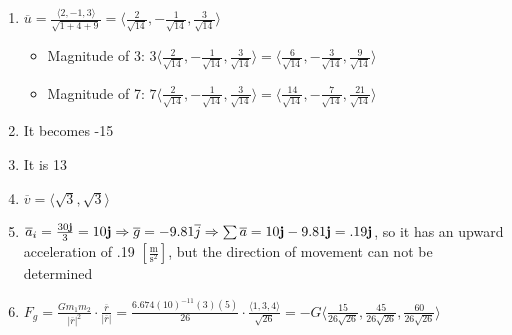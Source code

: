 \begin{enumerate}
\begin{itemize}
    \end{itemize}

    \setcounter{enumi}{35}

  \item $\overline{u} = \frac{\langle 2, -1, 3 \rangle}{\sqrt{1 + 4 + 9}} = \langle \frac{2}{\sqrt{14}}, -\frac{1}{\sqrt{14}}, \frac{3}{\sqrt{14}}\rangle$

    \begin{itemize}

      \item Magnitude of 3: $3\langle \frac{2}{\sqrt{14}}, -\frac{1}{\sqrt{14}}, \frac{3}{\sqrt{14}} \rangle = \langle \frac{6}{\sqrt{14}}, -\frac{3}{\sqrt{14}}, \frac{9}{\sqrt{14}} \rangle$

      \item Magnitude of 7: $7\langle \frac{2}{\sqrt{14}}, -\frac{1}{\sqrt{14}}, \frac{3}{\sqrt{14}} \rangle = \langle \frac{14}{\sqrt{14}}, -\frac{7}{\sqrt{14}}, \frac{21}{\sqrt{14}} \rangle$

    \end{itemize}

    \setcounter{enumi}{40}

  \item It becomes -15

  \item It is 13

  \item $\overline{v}=\langle \sqrt{3}, \sqrt{3} \rangle$

    \setcounter{enumi}{44}

  \item $\overline{a}_i = \frac{30\bold{j}}{3} = 10\bold{j} \Rightarrow \overline{g} = -9.81\overline{j} \Rightarrow \sum \overline{a} = 10\bold{j} - 9.81\bold{j} = .19\bold{j}$, so it has an upward acceleration of .19 $\left[ \frac{\si{\meter}}{\si{\second\squared}} \right]$, but the direction of movement can not be determined

  \item $F_g = \frac{Gm_1m_2}{|\overline{r}|^2}\cdot\frac{\overline{r}}{|\overline{r}|} = \frac{6.674(10)^{-11}(3)(5)}{26} \cdot \frac{\langle 1, 3, 4\rangle}{\sqrt{26}} = -G\langle \frac{15}{26\sqrt{26}}, \frac{45}{26\sqrt{26}}, \frac{60}{26\sqrt{26}} \rangle$

\end{enumerate}



